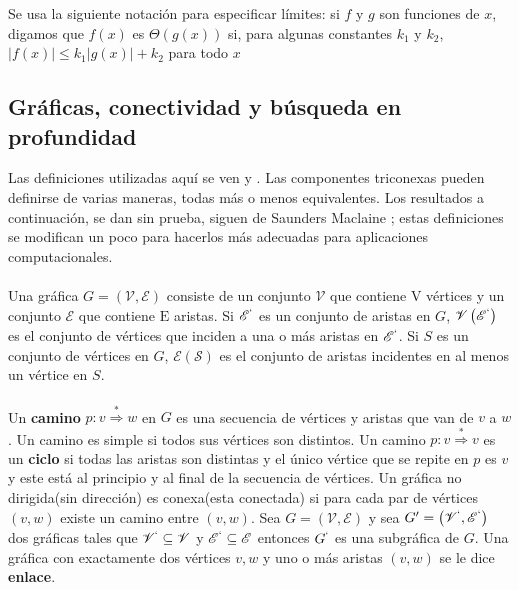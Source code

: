 Se usa la siguiente notación para especificar límites: si $f$ y $g$ son funciones de $x$, digamos que $f\left(x\right)$ es $\Theta\left(g\left(x\right)\right)$ si, para algunas constantes $k_{1}$ y $k_{2}$, $\left|f\left(x\right)\right| \leq k_{1}\left|g\left(x\right)\right| + k_{2}$ para todo $x$\\

\subsection{Gráficas, conectividad y búsqueda en profundidad}

Las definiciones utilizadas aquí se ven \citep{busacker1965finite} y \citep{harary1971graph}. Las componentes triconexas pueden definirse de varias maneras, todas más o menos equivalentes. Los resultados a continuación, se dan sin prueba, siguen de Saunders Maclaine \citep{mac-lane-1937}; estas definiciones se modifican un poco para hacerlos más adecuadas para aplicaciones computacionales.\\

\paragraph{}
Una gráfica $G = \left(\mathscr{V},\mathscr{E}\right)$ consiste de un conjunto $\mathscr{V}$ que contiene $\mathrm{V}$ vértices y un conjunto $\mathscr{E}$ que contiene $\mathrm{E}$ aristas. Si $\mathscr{E}^{`}$ es un conjunto de aristas en $G$, $\mathscr{V}\left(\mathscr{E}^{`}\right)$ es el conjunto de vértices que inciden a una o más aristas en $\mathscr{E}^{`}$. Si $S$ es un conjunto de vértices en $G$, $\mathscr{E}\left(\mathscr{S}\right)$  es el conjunto de aristas incidentes en al menos un vértice en $S$.

\paragraph{}
Un \textbf{camino} $p:v \overset{\ast}{\Rightarrow} w$ en $G$ es una secuencia de vértices y aristas que van de $v$ a $w$. Un camino es simple si todos sus vértices son distintos. Un camino $p:v \overset{\ast}{\Rightarrow} v$ es un \textbf{ciclo} si todas las aristas son distintas y el único vértice que se repite en $p$ es $v$ y este está al principio y al final de la secuencia de vértices. Un gráfica no dirigida(sin dirección) es conexa(esta conectada) si para cada par de vértices $(v, w)$ existe un camino entre $(v,w)$. Sea $G= \left(\mathscr{V},\mathscr{E}\right)$ y sea $G' =  \left(\mathscr{V}^{`},\mathscr{E}^{`}\right)$ dos gráficas tales que $\mathscr{V}^{`}\subseteq\mathscr{V}$ y $\mathscr{E}^{`}\subseteq \mathscr{E}$ entonces $G^{`}$ es una subgráfica de $G$. Una gráfica con exactamente dos vértices $v,w$ y uno o más aristas $\left(v,w\right)$ se le dice \textbf{enlace}.

